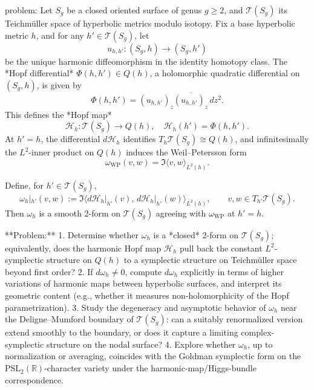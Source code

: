 problem:  
Let \(S_g\) be a closed oriented surface of genus \(g\ge 2\), and \(\mathcal{T}(S_g)\) its Teichmüller space of hyperbolic metrics modulo isotopy.  
Fix a base hyperbolic metric \(h\), and for any \(h'\in\mathcal{T}(S_g)\), let  
\[
u_{h,h'}:(S_g,h)\to(S_g,h')
\]
be the unique harmonic diffeomorphism in the identity homotopy class.  
The *Hopf differential* \(\Phi(h,h')\in Q(h)\), a holomorphic quadratic differential on \((S_g,h)\), is given by  
\[
\Phi(h,h') = (u_{h,h'})_z\overline{(u_{h,h'})_z}\,dz^2.
\]
This defines the *Hopf map*  
\[
\mathcal{H}_h:\mathcal{T}(S_g)\to Q(h), \quad \mathcal{H}_h(h')=\Phi(h,h').
\]
At \(h'=h\), the differential \(d\mathcal{H}_h\) identifies \(T_h\mathcal{T}(S_g)\cong Q(h)\), and infinitesimally the \(L^2\)-inner product on \(Q(h)\) induces the Weil–Petersson form  
\[
\omega_{\mathrm{WP}}(v,w)=\Im\langle v,w\rangle_{L^2(h)}.
\]

Define, for \(h' \in \mathcal{T}(S_g)\),
\[
\omega_h|_{h'}(v,w):=\Im\langle d\mathcal{H}_h|_{h'}(v),\, d\mathcal{H}_h|_{h'}(w)\rangle_{L^2(h)},\qquad v,w\in T_{h'}\mathcal{T}(S_g).
\]
Then \(\omega_h\) is a smooth 2-form on \(\mathcal{T}(S_g)\) agreeing with \(\omega_{\mathrm{WP}}\) at \(h'=h\).

**Problem:**  
1. Determine whether \(\omega_h\) is a *closed* 2-form on \(\mathcal{T}(S_g)\); equivalently, does the harmonic Hopf map \(\mathcal{H}_h\) pull back the constant \(L^2\)-symplectic structure on \(Q(h)\) to a symplectic structure on Teichmüller space beyond first order?  
2. If \(d\omega_h\neq 0\), compute \(d\omega_h\) explicitly in terms of higher variations of harmonic maps between hyperbolic surfaces, and interpret its geometric content (e.g., whether it measures non-holomorphicity of the Hopf parametrization).  
3. Study the degeneracy and asymptotic behavior of \(\omega_h\) near the Deligne–Mumford boundary of \(\mathcal{T}(S_g)\): can a suitably renormalized version extend smoothly to the boundary, or does it capture a limiting complex-symplectic structure on the nodal surface?  
4. Explore whether \(\omega_h\), up to normalization or averaging, coincides with the Goldman symplectic form on the \(\mathrm{PSL}_2(\mathbb{R})\)-character variety under the harmonic-map/Higgs-bundle correspondence.

